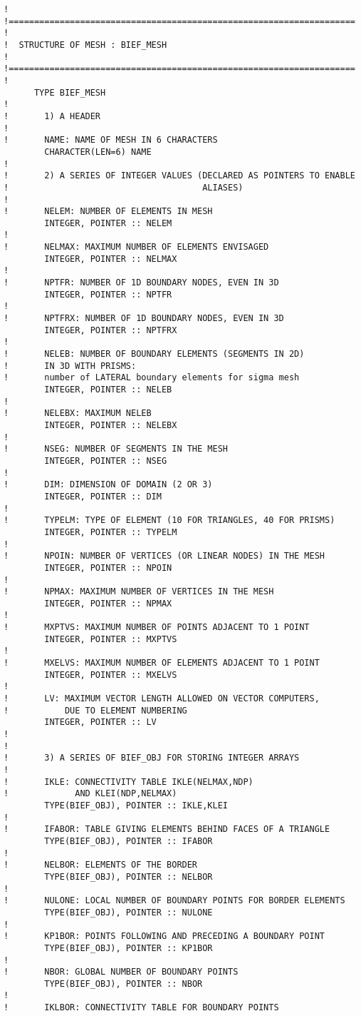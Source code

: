 \begin{lstlisting}[language=TelFortran]
!
!====================================================================
!
!  STRUCTURE OF MESH : BIEF_MESH
!
!====================================================================
!
      TYPE BIEF_MESH
!
!       1) A HEADER
!
!       NAME: NAME OF MESH IN 6 CHARACTERS
        CHARACTER(LEN=6) NAME
!
!       2) A SERIES OF INTEGER VALUES (DECLARED AS POINTERS TO ENABLE
!                                      ALIASES)
!
!       NELEM: NUMBER OF ELEMENTS IN MESH
        INTEGER, POINTER :: NELEM
!
!       NELMAX: MAXIMUM NUMBER OF ELEMENTS ENVISAGED
        INTEGER, POINTER :: NELMAX
!
!       NPTFR: NUMBER OF 1D BOUNDARY NODES, EVEN IN 3D
        INTEGER, POINTER :: NPTFR
!
!       NPTFRX: NUMBER OF 1D BOUNDARY NODES, EVEN IN 3D
        INTEGER, POINTER :: NPTFRX
!
!       NELEB: NUMBER OF BOUNDARY ELEMENTS (SEGMENTS IN 2D)
!       IN 3D WITH PRISMS:
!       number of LATERAL boundary elements for sigma mesh
        INTEGER, POINTER :: NELEB
!
!       NELEBX: MAXIMUM NELEB
        INTEGER, POINTER :: NELEBX
!
!       NSEG: NUMBER OF SEGMENTS IN THE MESH
        INTEGER, POINTER :: NSEG
!
!       DIM: DIMENSION OF DOMAIN (2 OR 3)
        INTEGER, POINTER :: DIM
!
!       TYPELM: TYPE OF ELEMENT (10 FOR TRIANGLES, 40 FOR PRISMS)
        INTEGER, POINTER :: TYPELM
!
!       NPOIN: NUMBER OF VERTICES (OR LINEAR NODES) IN THE MESH
        INTEGER, POINTER :: NPOIN
!
!       NPMAX: MAXIMUM NUMBER OF VERTICES IN THE MESH
        INTEGER, POINTER :: NPMAX
!
!       MXPTVS: MAXIMUM NUMBER OF POINTS ADJACENT TO 1 POINT
        INTEGER, POINTER :: MXPTVS
!
!       MXELVS: MAXIMUM NUMBER OF ELEMENTS ADJACENT TO 1 POINT
        INTEGER, POINTER :: MXELVS
!
!       LV: MAXIMUM VECTOR LENGTH ALLOWED ON VECTOR COMPUTERS,
!           DUE TO ELEMENT NUMBERING
        INTEGER, POINTER :: LV
!
!
!       3) A SERIES OF BIEF_OBJ FOR STORING INTEGER ARRAYS
!
!       IKLE: CONNECTIVITY TABLE IKLE(NELMAX,NDP)
!             AND KLEI(NDP,NELMAX)
        TYPE(BIEF_OBJ), POINTER :: IKLE,KLEI
!
!       IFABOR: TABLE GIVING ELEMENTS BEHIND FACES OF A TRIANGLE
        TYPE(BIEF_OBJ), POINTER :: IFABOR
!
!       NELBOR: ELEMENTS OF THE BORDER
        TYPE(BIEF_OBJ), POINTER :: NELBOR
!
!       NULONE: LOCAL NUMBER OF BOUNDARY POINTS FOR BORDER ELEMENTS
        TYPE(BIEF_OBJ), POINTER :: NULONE
!
!       KP1BOR: POINTS FOLLOWING AND PRECEDING A BOUNDARY POINT
        TYPE(BIEF_OBJ), POINTER :: KP1BOR
!
!       NBOR: GLOBAL NUMBER OF BOUNDARY POINTS
        TYPE(BIEF_OBJ), POINTER :: NBOR
!
!       IKLBOR: CONNECTIVITY TABLE FOR BOUNDARY POINTS

\end{lstlisting}
